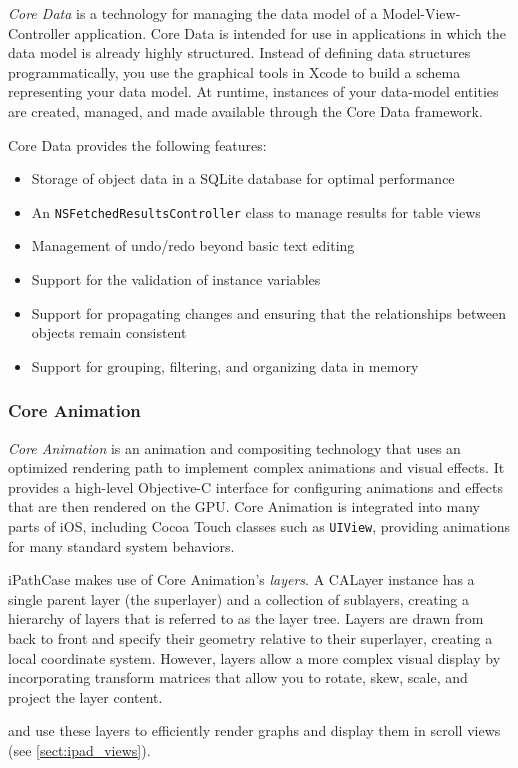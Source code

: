 \emph{Core Data} is a technology for managing the data model of a
Model-View-Controller application. Core Data is intended for use in applications
in which the data model is already highly structured. Instead of defining data
structures programmatically, you use the graphical tools in Xcode to build a
schema representing your data model. At runtime, instances of your data-model
entities are created, managed, and made available through the Core Data
framework.

Core Data provides the following features:

\begin{itemize}
    \item Storage of object data in a SQLite database for optimal performance
    \item An \texttt{NSFetchedResultsController} class to manage results for table views
    \item Management of undo/redo beyond basic text editing
    \item Support for the validation of instance variables
    \item Support for propagating changes and ensuring that the relationships between objects remain consistent
    \item Support for grouping, filtering, and organizing data in memory
\end{itemize}

\subsubsection{Core Animation}
\label{sect:core_animation}

\emph{Core Animation} is an animation and compositing technology that uses an
optimized rendering path to implement complex animations and visual effects. It
provides a high-level Objective-C interface for configuring animations and
effects that are then rendered on the GPU. Core Animation is integrated into
many parts of iOS, including Cocoa Touch classes such as \texttt{UIView},
providing animations for many standard system behaviors.

iPathCase makes use of Core Animation's \emph{layers}. A CALayer instance has a
single parent layer (the superlayer) and a collection of sublayers, creating a
hierarchy of layers that is referred to as the layer tree. Layers are drawn from
back to front and specify their geometry relative to their superlayer, creating
a local coordinate system. However, layers allow a more complex visual display
by incorporating transform matrices that allow you to rotate, skew, scale, and
project the layer content.

\mawapp and \keggapp use these layers to efficiently render graphs and display
them in scroll views (see \ref{sect:ipad_views}).
